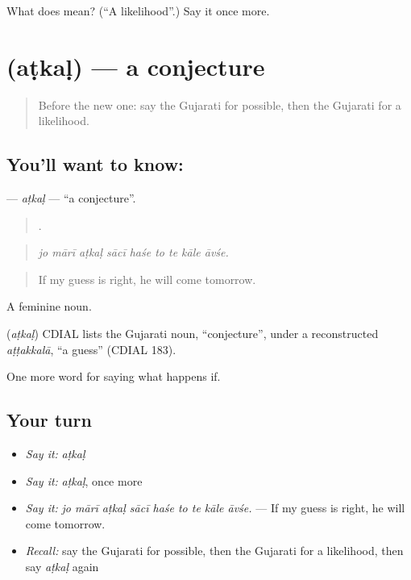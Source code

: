 \begin{tcolorbox}[breakable,colback=teal!4,colframe=teal!35!black,title={Before you move on}]
What does  mean? (\textquotedblleft{}A likelihood\textquotedblright{}.) Say it once more.
\end{tcolorbox}
\section[\texorpdfstring{\gu{અટકળ} (aṭkaḷ)}{અટકળ (aṭkaḷ)}]{ (aṭkaḷ) — a conjecture}

\label{lesson:GU-C366-atkal}



\begin{quote}
Before the new one: say the Gujarati for possible, then the Gujarati for a likelihood.
\end{quote}

\subsection*{You'll want to know: }
\textbf{} — \emph{aṭkaḷ} — \textquotedblleft{}a conjecture\textquotedblright{}.

\begin{quote}
        .
\end{quote}

\begin{quote}
\emph{jo mārī aṭkaḷ sācī haśe to te kāle āvśe.}
\end{quote}

\begin{quote}
If my guess is right, he will come tomorrow.
\end{quote}

A feminine noun.

\begin{cousinweb}
\textbf{} (\emph{aṭkaḷ}) CDIAL lists the Gujarati noun, \textquotedblleft{}conjecture\textquotedblright{}, under a reconstructed \emph{aṭṭakkalā}, \textquotedblleft{}a guess\textquotedblright{} (CDIAL 183).
\end{cousinweb}

\begin{grammarlens}[title={What you've built}]
One more word for saying what happens if.
\end{grammarlens}

\subsection*{Your turn}
\begin{itemize}
\raggedright
  \item \emph{Say it:} \emph{aṭkaḷ}
  \item \emph{Say it:} \emph{aṭkaḷ}, once more
  \item \emph{Say it:} \emph{jo mārī aṭkaḷ sācī haśe to te kāle āvśe.} — If my guess is right, he will come tomorrow.
  \item \emph{Recall:} say the Gujarati for possible, then the Gujarati for a likelihood, then say \emph{aṭkaḷ} again
\end{itemize}


